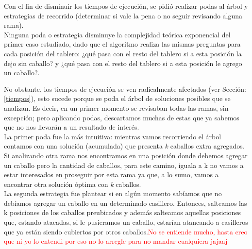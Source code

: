 Con el fin de disminuir los tiempos de ejecuci\'on, se pidi\'o realizar podas al \'arbol y estrategias de recorrido (determinar si vale la pena o no seguir revisando alguna rama).\\

Ninguna poda o estrategia disminuye la complejidad te\'orica exponencial del primer caso estudiado, dado que el algoritmo realiza las mismas preguntas para cada posici\'on del tablero: ¿qu\'e pasa con el resto del tablero si a esta posici\'on la dejo sin caballo? y ¿qu\'e pasa con el resto del tablero si a esta posici\'on le agrego un caballo?. 

No obstante, los tiempos de ejecuci\'on se ven radicalmente afectados (ver Secci\'on: \ref{tiempos}), esto sucede porque se poda el \'arbol de soluciones posibles que se analizan. Es decir, en un primer momento se revisaban todas las ramas, sin excepci\'on; pero aplicando podas, descartamos muchas de estas que ya sabemos que no nos llevar\'an a un resultado de inter\'es.\\


La primer poda fue la m\'as intuitiva: mientras vamos recorriendo el \'arbol contamos con una soluci\'on (acumulada) que presenta \emph{k} caballos extra agregados. Si analizando otra rama nos encontramos en una posici\'on donde debemos agregar un caballo pero la cantidad de caballos, para este camino, iguala a k no vamos a estar interesados en proseguir por esta rama ya que, a lo sumo, vamos a encontrar otra soluci\'on \'optima con \emph{k} caballos.\\



La segunda estrategia fue plantear si en alg\'un momento sab\'iamos que no deb\'iamos agregar un caballo en un determinado casillero. Entonces, salteamos las k posiciones de los caballos preubicados y adem\'as salteamos aquellas posiciones que, estando atacadas, si le pusieramos un caballo, estar\'ian atancando a casilleros que ya est\'an siendo cubiertos por otros caballos.\textcolor{red}{No se entiende mucho, hasta creo que ni yo lo entendi por eso no lo arregle para no mandar cualquiera jajaaj}\\

